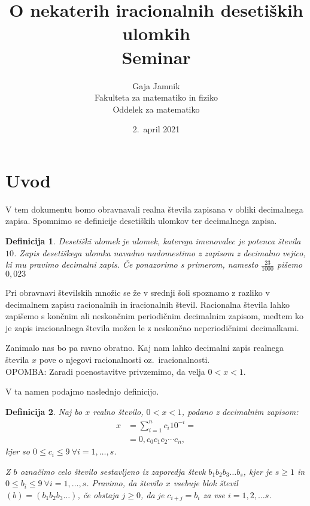 \documentclass[a4paper,12pt]{article}
\title{O nekaterih iracionalnih desetiških ulomkih \\ 
\Large Seminar}
\author{Gaja Jamnik \\
Fakulteta za matematiko in fiziko \\
Oddelek za matematiko}
\date{2.\ april 2021}
\newtheorem{definicija}{Definicija}
\begin{document}


\maketitle



\section{Uvod}
V tem dokumentu bomo obravnavali realna števila zapisana v obliki decimalnega zapisa.
Spomnimo se definicije desetiških ulomkov ter decimalnega zapisa.

\begin{definicija}
    {\em Desetiški ulomek} je ulomek, katerega imenovalec je potenca števila $10$. Zapis desetiškega ulomka navadno
    nadomestimo z zapisom z decimalno vejico, ki mu pravimo {\em decimalni zapis}. Če ponazorimo s primerom, namesto 
    $ \frac{23}{1000}$ pišemo $0,023$ 
\end{definicija}

Pri obravnavi številskih množic se že v srednji šoli spoznamo z razliko v decimalnem zapisu
racionalnih in iracionalnih števil. Racionalna števila lahko zapišemo
s končnim ali neskončnim periodičnim decimalnim zapisom, medtem ko je zapis iracionalnega števila možen 
le z neskončno neperiodičnimi decimalkami.

Zanimalo nas bo pa ravno obratno. Kaj nam lahko decimalni zapis realnega števila $x$ pove o njegovi racionalnosti
oz.\ iracionalnosti. \\
OPOMBA: Zaradi poenostavitve privzemimo, da velja $ 0 < x < 1$.


V ta namen podajmo naslednjo definicijo.

\begin{definicija}
    \label{defincija blokov}
    Naj bo $x$ realno število, $ 0 < x < 1$, podano z decimalnim zapisom: 
    \[ 
        \begin{split}
            x & = \sum^n_{i=1} c_i 10^{-i} = \\
            & = 0,c_0c_1c_2 \cdots c_n ,
        \end{split}   
    \]
    kjer so $0 \leq c_i \leq 9 \ \forall i = 1, \dots, s$.
    
    Z $b$ označimo celo število sestavljeno iz zaporedja števk
    $b_1b_2b_3 \dots b_s$, 
    kjer je $s\geq 1$ in $0 \leq b_i \leq 9 \ \forall i = 1, \dots, s$.
    Pravimo, da število $x$ {\em vsebuje blok števil $(b) = (b_1b_2b_3 \dots)$}, če obstaja $j \geq 0$, da je 
    $c_{i+j} = b_i$ za vse $i=1, 2, \dots s$.
\end{definicija}
\end{document}
